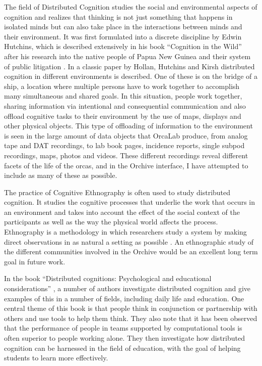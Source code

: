 The field of Distributed Cognition studies the social and
environmental aspects of cognition and realizes that thinking is not
just something that happens in isolated minds but can also take place
in the interactions between minds and their environment.  It was first
formulated into a discrete discipline by Edwin Hutchins, which is
described extensively in his book ``Cognition in the Wild''
\cite{hutchins1996cognition} after his research into the native people
of Papua New Guinea and their system of public litigation
\cite{hutchins1980culture}.  In a classic paper by Hollan, Hutchins
and Kirsh \cite{hollan2000distributed} distributed cognition in
different environments is described.  One of these is on the bridge of
a ship, a location where multiple persons have to work together to
accomplish many simultaneous and shared goals.  In this situation,
people work together, sharing information via intentional and
consequential communication and also offload cognitive tasks to their
environment by the use of maps, displays and other physical objects.
This type of offloading of information to the environment is seen in
the large amount of data objects that OrcaLab produce, from analog
tape and DAT recordings, to lab book pages, incidence reports, single
subpod recordings, maps, photos and videos.  These different
recordings reveal different facets of the life of the orcas, and in
the Orchive interface, I have attempted to include as many of these
as possible.

The practice of Cognitive Ethnography \cite{hollan2000distributed} is
often used to study distributed cognition.  It studies the cognitive
processes that underlie the work that occurs in an environment and
takes into account the effect of the social context of the
participants as well as the way the physical world affects the
process.  Ethnography is a methodology in which researchers study a
system by making direct observations in as natural a setting as
possible \cite{mcgrath1995methodology}.  An ethnographic study of the
different communities involved in the Orchive would be an excellent
long term goal in future work.

In the book ``Distributed cognitions: Psychological and educational
considerations'' \cite{salomon1997distributed}, a number of authors
investigate distributed cognition and give examples of this in a
number of fields, including daily life and education.  One central
theme of this book is that people think in conjunction or partnership
with others and use tools to help them think.  They also note that it
has been observed that the performance of people in teams supported by
computational tools is often superior to people working alone.  They
then investigate how distributed cognition can be harnessed in the
field of education, with the goal of helping students to learn more
effectively.

